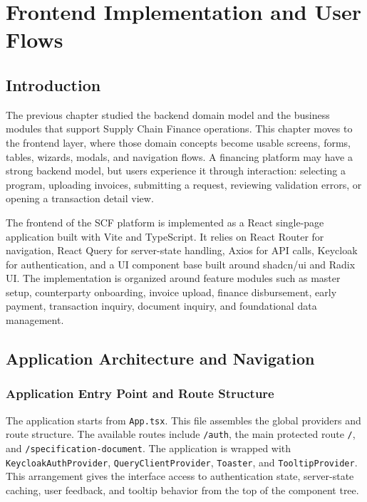 \chapter{Frontend Implementation and User Flows}
\label{chap:frontend_implementation}

\section{Introduction}
\label{sec:ch4_introduction}

The previous chapter studied the backend domain model and the business modules that support Supply Chain Finance operations. This chapter moves to the frontend layer, where those domain concepts become usable screens, forms, tables, wizards, modals, and navigation flows. A financing platform may have a strong backend model, but users experience it through interaction: selecting a program, uploading invoices, submitting a request, reviewing validation errors, or opening a transaction detail view.

The frontend of the SCF platform is implemented as a React single-page application built with Vite and TypeScript. It relies on React Router for navigation, React Query for server-state handling, Axios for API calls, Keycloak for authentication, and a UI component base built around shadcn/ui and Radix UI. The implementation is organized around feature modules such as master setup, counterparty onboarding, invoice upload, finance disbursement, early payment, transaction inquiry, document inquiry, and foundational data management.

\section{Application Architecture and Navigation}
\label{sec:application_navigation}

\subsection{Application Entry Point and Route Structure}
\label{subsec:app_entry_routes}

The application starts from \texttt{App.tsx}. This file assembles the global providers and route structure. The available routes include \texttt{/auth}, the main protected route \texttt{/}, and \texttt{/specification-document}. The application is wrapped with \texttt{KeycloakAuthProvider}, \texttt{QueryClientProvider}, \texttt{Toaster}, and \texttt{TooltipProvider}. This arrangement gives the interface access to authentication state, server-state caching, user feedback, and tooltip behavior from the top of the component tree.


